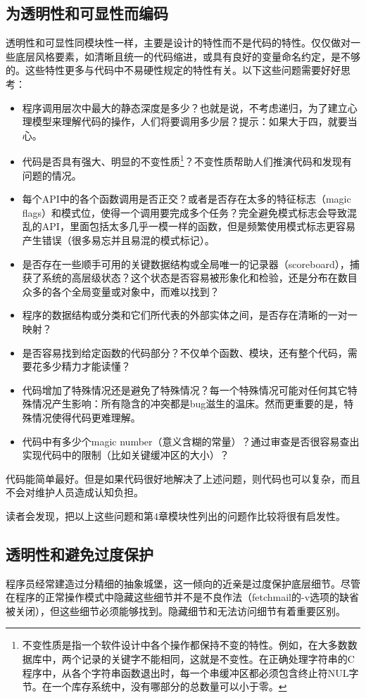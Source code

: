 \documentclass[12pt,oneside]{ctexbook}
\begin{document}
\begin{common-format}
\subsection{为透明性和可显性而编码}
透明性和可显性同模块性一样，主要是设计的特性而不是代码的特性。仅仅做对一些底层风格要素，如清晰且统一的代码缩进，或具有良好的变量命名约定，是不够的。这些特性更多与代码中不易硬性规定的特性有关。以下这些问题需要好好思考：
\begin{itemize}
\item 程序调用层次中最大的静态深度是多少？也就是说，不考虑递归，为了建立心理模型来理解代码的操作，人们将要调用多少层？提示：如果大于四，就要当心。
\item 代码是否具有强大、明显的不变性质\footnote{不变性质是指一个软件设计中各个操作都保持不变的特性。例如，在大多数数据库中，两个记录的关键字不能相同，这就是不变性。在正确处理字符串的C程序中，从各个字符串函数退出时，每一个串缓冲区都必须包含终止符NUL字节。在一个库存系统中，没有哪部分的总数量可以小于零。}？不变性质帮助人们推演代码和发现有问题的情况。
\item 每个API中的各个函数调用是否正交？或者是否存在太多的特征标志（magic flags）和模式位，使得一个调用要完成多个任务？完全避免模式标志会导致混乱的API，里面包括太多几乎一模一样的函数，但是频繁使用模式标志更容易产生错误（很多易忘并且易混的模式标记）。
\item 是否存在一些顺手可用的关键数据结构或全局唯一的记录器（scoreboard），捕获了系统的高层级状态？这个状态是否容易被形象化和检验，还是分布在数目众多的各个全局变量或对象中，而难以找到？
\item 程序的数据结构或分类和它们所代表的外部实体之间，是否存在清晰的一对一映射？
\item 是否容易找到给定函数的代码部分？不仅单个函数、模块，还有整个代码，需要花多少精力才能读懂？
\item 代码增加了特殊情况还是避免了特殊情况？每一个特殊情况可能对任何其它特殊情况产生影响：所有隐含的冲突都是bug滋生的温床。然而更重要的是，特殊情况使得代码更难理解。
\item 代码中有多少个magic number（意义含糊的常量）？通过审查是否很容易查出实现代码中的限制（比如关键缓冲区的大小）？
\end{itemize}

代码能简单最好。但是如果代码很好地解决了上述问题，则代码也可以复杂，而且不会对维护人员造成认知负担。

读者会发现，把以上这些问题和第4章模块性列出的问题作比较将很有启发性。


\subsection{透明性和避免过度保护}
程序员经常建造过分精细的抽象城堡，这一倾向的近亲是过度保护底层细节。尽管在程序的正常操作模式中隐藏这些细节并不是不良作法（fetchmail的-v选项的缺省被关闭），但这些细节必须能够找到。隐藏细节和无法访问细节有着重要区别。


\end{common-format}
\end{document}
